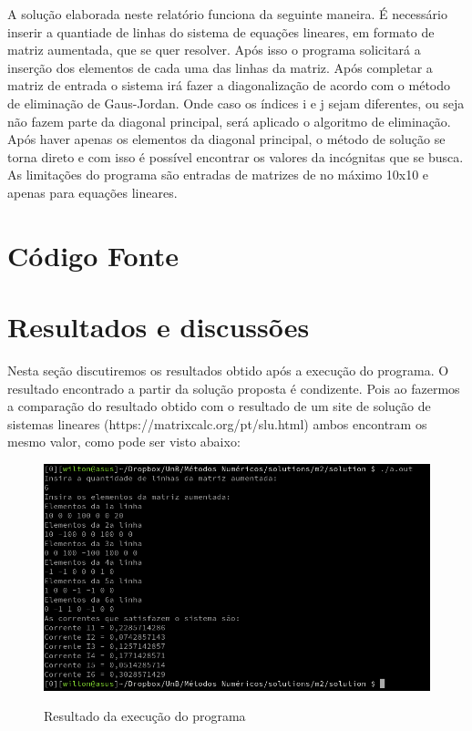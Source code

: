\documentclass[12pt, hidelinks]{article}
\begin{document}
A solução elaborada neste relatório funciona da seguinte maneira. É necessário inserir a quantiade de linhas
do sistema de equações lineares, em formato de matriz aumentada, que se quer resolver. Após isso o programa
solicitará a inserção dos elementos de cada uma das linhas da matriz. Após completar a matriz de entrada o
sistema irá fazer a diagonalização de acordo com o método de eliminação de Gaus-Jordan. Onde caso os índices
i e j sejam diferentes, ou seja não fazem parte da diagonal principal, será aplicado o algoritmo de eliminação.
Após haver apenas os elementos da diagonal principal, o método de solução se torna direto e com isso é possível
encontrar os valores da incógnitas que se busca. As limitações do programa são entradas de matrizes de no máximo
10x10 e apenas para equações lineares.

\newpage
\section{Código Fonte}



\newpage
\section{Resultados e discussões}

Nesta seção discutiremos os resultados obtido após a execução do programa.
O resultado encontrado a partir da solução proposta é condizente. Pois ao fazermos a comparação
do resultado obtido com o resultado de um site de solução de sistemas lineares (https://matrixcalc.org/pt/slu.html) ambos encontram
os mesmo valor, como pode ser visto abaixo:

\begin{figure}[!h]
  \centering
  \includegraphics[width=15cm]{figuras/printx.png}\\
  \caption{Resultado da execução do programa}\label{fig:printx}
\end{figure}
\end{document}
